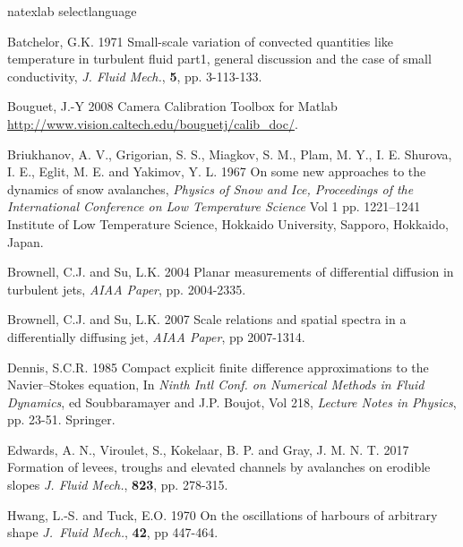 \documentclass[lineno]{jfm}
\begin{document}
\begin{thebibliography}{99}

\expandafter\ifx\csname natexlab\endcsname\relax
\def\natexlab#1{#1}\fi
\expandafter\ifx\csname selectlanguage\endcsname\relax
\def\selectlanguage#1{\relax}\fi

{\sc Batchelor, G.K.} 1971 {Small-scale variation of convected quantities like temperature in turbulent fluid part1, general discussion and the case of small conductivity}, {\it J. Fluid Mech.}, {\bf 5}, pp. 3-113-133.

{\sc Bouguet, J.-Y} 2008 Camera Calibration Toolbox for Matlab {\url{http://www.vision.caltech.edu/bouguetj/calib_doc/}}.

{\sc Briukhanov, A. V.,   Grigorian, S. S., Miagkov,  S. M., Plam, M. Y.,   I. E. Shurova, I. E.,   Eglit, M. E. and Yakimov, Y. L.} 1967
{On some new approaches to the dynamics of snow avalanches},
{\it Physics of Snow and Ice,  Proceedings of the International Conference on Low Temperature Science}
{Vol 1} pp. 1221--1241 {Institute of Low Temperature Science, Hokkaido University, Sapporo, Hokkaido, Japan}.

 {\sc Brownell,  C.J.  and Su,  L.K.} 2004  {Planar measurements of differential diffusion in turbulent jets}, {\it AIAA Paper},  pp. 2004-2335.

  {\sc Brownell, C.J. and  Su, L.K.} 2007 {Scale relations and spatial spectra in a differentially diffusing jet}, {\it AIAA Paper}, pp 2007-1314.

 {\sc  Dennis, S.C.R.} 1985 {Compact explicit finite difference approximations to the Navier--Stokes equation},  { In \it Ninth Intl Conf. on Numerical Methods in Fluid Dynamics},  {ed Soubbaramayer and J.P. Boujot},  {Vol 218}, {\it Lecture Notes in Physics}, pp. 23-51. Springer.

{\sc Edwards, A. N., Viroulet, S., Kokelaar, B. P. and Gray, J. M. N. T.} 2017 Formation of levees, troughs and elevated channels by avalanches on erodible slopes {\it J. Fluid Mech.}, {\bf 823}, pp. 278-315.

 {\sc Hwang,  L.-S.  and  Tuck, E.O.} 1970 On the oscillations of harbours of arbitrary shape {\it J.~Fluid Mech.}, {\bf42}, pp 447-464.


\end{thebibliography}
\end{document}
